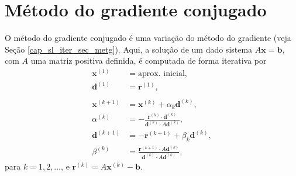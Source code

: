 \emconstrucao

\section{Método do gradiente conjugado}\label{cap_sl_iter_sec_metgc}

O método do gradiente conjugado é uma variação do método do gradiente (veja Seção \ref{cap_sl_iter_sec_metg}). Aqui, a solução de um dado sistema $A\pmb{x}=\pmb{b}$, com $A$ uma matriz positiva definida, é computada de forma iterativa por
\begin{align}
  \pmb{x}^{(1)} &= \text{aprox. inicial},\\
  \pmb{d}^{(1)} &= \pmb{r}^{(1)},\\
  &\\
  \pmb{x}^{(k+1)} &= \pmb{x}^{(k)} + \alpha_k\pmb{d}^{(k)},\\
  \alpha^{(k)} &= -\frac{\pmb{r}^{(k)}\cdot \pmb{d}^{(k)}}{\pmb{d}^{(k)}\cdot A\pmb{d}^{(k)}},\\
  \pmb{d}^{(k+1)} &= -\pmb{r}^{(k+1)}+\beta_k\pmb{d}^{(k)},\\
  \beta^{(k)} &= \frac{\pmb{r}^{(k+1)}\cdot A\pmb{d}^{(k)}}{\pmb{d}^{(k)}\cdot A\pmb{d}^{(k)}},
\end{align}
para $k = 1, 2, \ldots$, e $\pmb{r}^{(k)} = A\pmb{x}^{(k)}-\pmb{b}$.

